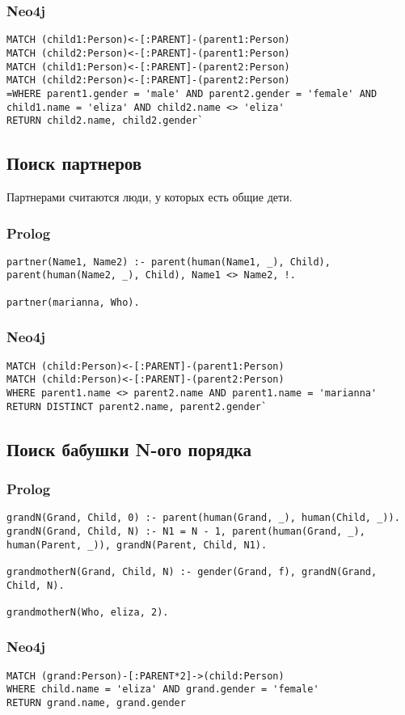 \subsubsection{Neo4j}
\begin{lstlisting}[label=div,caption=Запрос]
MATCH (child1:Person)<-[:PARENT]-(parent1:Person)
MATCH (child2:Person)<-[:PARENT]-(parent1:Person)
MATCH (child1:Person)<-[:PARENT]-(parent2:Person)
MATCH (child2:Person)<-[:PARENT]-(parent2:Person)
=WHERE parent1.gender = 'male' AND parent2.gender = 'female' AND child1.name = 'eliza' AND child2.name <> 'eliza'
RETURN child2.name, child2.gender`
\end{lstlisting}

\subsection{Поиск партнеров}
Партнерами считаются люди, у которых есть общие дети.

\subsubsection{Prolog}
\begin{lstlisting}[label=div,caption=Запрос]
partner(Name1, Name2) :- parent(human(Name1, _), Child), parent(human(Name2, _), Child), Name1 <> Name2, !.

partner(marianna, Who).
\end{lstlisting}

\subsubsection{Neo4j}
\begin{lstlisting}[label=div,caption=Запрос]
MATCH (child:Person)<-[:PARENT]-(parent1:Person)
MATCH (child:Person)<-[:PARENT]-(parent2:Person)
WHERE parent1.name <> parent2.name AND parent1.name = 'marianna'
RETURN DISTINCT parent2.name, parent2.gender`
\end{lstlisting}

\subsection{Поиск бабушки N-ого порядка}

\subsubsection{Prolog}
\begin{lstlisting}[label=div,caption=Запрос]
grandN(Grand, Child, 0) :- parent(human(Grand, _), human(Child, _)).
grandN(Grand, Child, N) :- N1 = N - 1, parent(human(Grand, _), human(Parent, _)), grandN(Parent, Child, N1).
	
grandmotherN(Grand, Child, N) :- gender(Grand, f), grandN(Grand, Child, N).

grandmotherN(Who, eliza, 2).
\end{lstlisting}

\subsubsection{Neo4j}
\begin{lstlisting}[label=div,caption=Запрос]
MATCH (grand:Person)-[:PARENT*2]->(child:Person)
WHERE child.name = 'eliza' AND grand.gender = 'female'
RETURN grand.name, grand.gender
\end{lstlisting}

